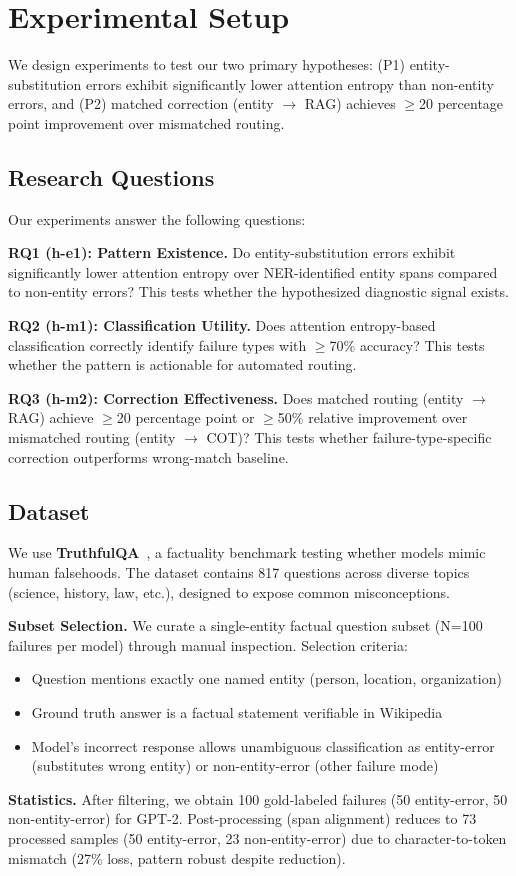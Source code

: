 \section{Experimental Setup}
\label{sec:experiments}

We design experiments to test our two primary hypotheses: (P1) entity-substitution errors exhibit significantly lower attention entropy than non-entity errors, and (P2) matched correction (entity $\to$ RAG) achieves $\geq$20 percentage point improvement over mismatched routing.

\subsection{Research Questions}

Our experiments answer the following questions:

\textbf{RQ1 (h-e1): Pattern Existence.} Do entity-substitution errors exhibit significantly lower attention entropy over NER-identified entity spans compared to non-entity errors? This tests whether the hypothesized diagnostic signal exists.

\textbf{RQ2 (h-m1): Classification Utility.} Does attention entropy-based classification correctly identify failure types with $\geq$70\% accuracy? This tests whether the pattern is actionable for automated routing.

\textbf{RQ3 (h-m2): Correction Effectiveness.} Does matched routing (entity $\to$ RAG) achieve $\geq$20 percentage point or $\geq$50\% relative improvement over mismatched routing (entity $\to$ COT)? This tests whether failure-type-specific correction outperforms wrong-match baseline.

\subsection{Dataset}

We use \textbf{TruthfulQA}~\cite{Lin2021TruthfulQA}, a factuality benchmark testing whether models mimic human falsehoods. The dataset contains 817 questions across diverse topics (science, history, law, etc.), designed to expose common misconceptions.

\textbf{Subset Selection.} We curate a single-entity factual question subset (N=100 failures per model) through manual inspection. Selection criteria:
\begin{itemize}
\item Question mentions exactly one named entity (person, location, organization)
\item Ground truth answer is a factual statement verifiable in Wikipedia
\item Model's incorrect response allows unambiguous classification as entity-error (substitutes wrong entity) or non-entity-error (other failure mode)
\end{itemize}

\textbf{Statistics.} After filtering, we obtain 100 gold-labeled failures (50 entity-error, 50 non-entity-error) for GPT-2. Post-processing (span alignment) reduces to 73 processed samples (50 entity-error, 23 non-entity-error) due to character-to-token mismatch (27\% loss, pattern robust despite reduction).
